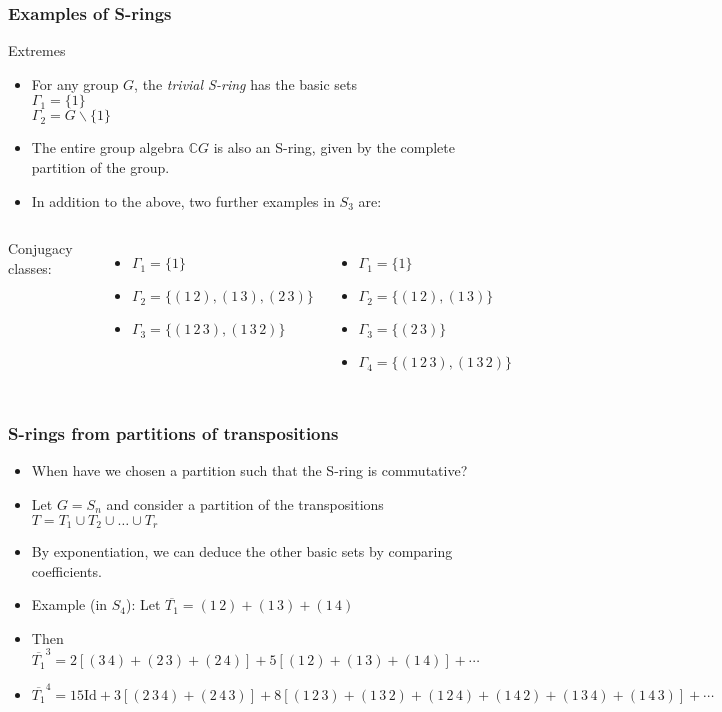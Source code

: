 \documentclass{beamer}
\begin{document}
\begin{frame}
\frametitle{Examples of S-rings}

\begin{block}{Extremes}
\begin{itemize}
\item For any group $G$, the \emph{trivial S-ring} has the basic sets\\
$\Gamma_1=\{1\}$\\ $\Gamma_2=G\backslash \{1\}$\pause
\item The entire group algebra $\mathbb{C}G$ is also an S-ring, given
  by the complete partition of the group. \pause
\end{itemize}
\end{block}

\begin{itemize}
\item In addition to the above, two further examples in $S_3$ are:
\end{itemize}

\begin{columns}
Conjugacy classes:
\begin{itemize}
\item $\Gamma_1=\{1\}$
\item $\Gamma_2=\{(1\,2), (1\,3), (2\,3)\}$
\item $\Gamma_3=\{(1\,2\,3),(1\,3\,2)\}$
\end{itemize}
\begin{itemize}
\item $\Gamma_1=\{1\}$
\item $\Gamma_2=\{(1\,2),(1\,3)\}$
\item $\Gamma_3=\{(2\,3)\}$
\item $\Gamma_4=\{(1\,2\,3),(1\,3\,2)\}$
\end{itemize}
\end{columns}
\end{frame}


\begin{frame}
\frametitle{S-rings from partitions of transpositions}
\begin{itemize}
\item When have we chosen a partition such that the S-ring is commutative?\pause
\item Let $G=S_n$ and consider a partition of the transpositions $T = 
  T_1 \cup T_2 \cup \ldots \cup T_r $\pause
\item By exponentiation, we can deduce the other basic sets
  by comparing coefficients.\pause
\item Example (in $S_4$): Let $\overline{T_1} = (1\,2)+(1\,3)+(1\,4)$ \pause
\item Then $ \overline{T_1}^3 = 2\left[(3\,4) +
    (2\,3) + (2\,4)\right] + 5\left[ (1\,2) + (1\,3) + (1\,4)\right] +
  \cdots$\pause
\item $\overline{T_1}^4 = 15\mathrm{Id} + 3\left[(2\,3\,4) + (2\,4\,3)\right] +
  8\left[ (1\,2\,3) + (1\,3\,2) + (1\,2\,4) + (1\,4\,2) + (1\,3\,4) +
    (1\,4\,3)\right]+\cdots$
\end{itemize}
\end{frame}
\end{document}

